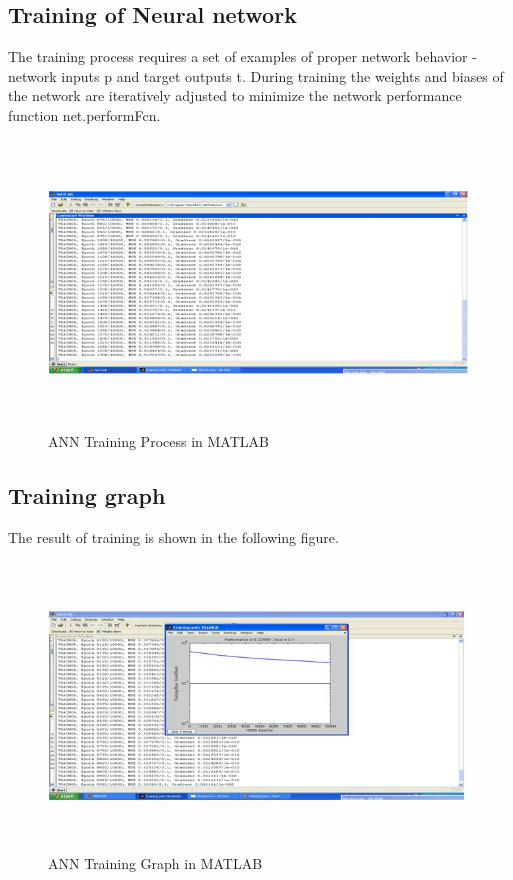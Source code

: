 \documentclass[a4paper,14pt,onecolumn]{article}
\begin{document}
\subsection{Training of Neural network}
The training process requires a set of examples of proper network behavior - network inputs p and target outputs t. During training the weights and biases of the network are iteratively adjusted to minimize the network performance function net.performFcn.
\begin{figure}[h!]
\begin{center}
\includegraphics[height=3in,width=5in]
{NNTrain.jpg} 
\caption{ANN Training Process in MATLAB}
\end{center}
\end{figure}

\subsection{Training graph}
The result of training is shown in the following figure.
\begin{figure}[h!]
\begin{center}
\includegraphics[height=3in,width=5in]
{NNTraing.jpg} 
\caption{ANN Training Graph in MATLAB}
\end{center}
\end{figure}
\end{document}
